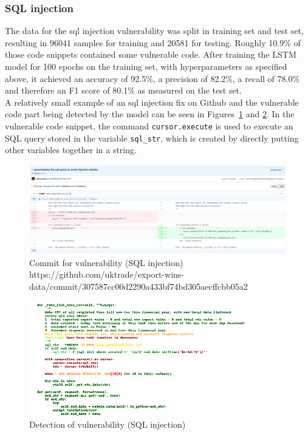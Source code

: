 \documentclass[
a4paper,
pagesize,
pdftex,
12pt,
twoside, %
BCOR=5mm, %
ngerman,
fleqn,
final,
]{scrartcl}
\begin{document}
	\newpage
	
	\subsubsection{SQL injection}
	The data for the sql injection vulnerability was split in training set and test set, resulting in 96041 samples for training and 20581 for testing. Roughly 10.9\% of those code snippets contained some vulnerable code. After training the LSTM model for 100 epochs on the training set, with hyperparameters as specified above, it achieved an accuracy of 92.5\%, a precision of 82.2\%, a recall of 78.0\% and therefore an F1 score of 80.1\% as measured on the test set.\\
	A relatively small example of an sql injection fix on Github and the vulnerable code part being detected by the model can be seen in Figures~\ref{fig:sqlB} and \ref{fig:sqlBr}. In the vulnerable code snippet, the command \texttt{cursor.execute} is used to execute an SQL query stored in the variable \texttt{sql\_str}, which is created by directly putting other variables together in a string.
	
	\begin{figure}[H]
		\centering
		\includegraphics[width=\linewidth]{Images/sqlB}
		\caption{Commit for vulnerability (SQL injection) \newline \scriptsize{https://github.com/uktrade/export-wins-data/commit/307587cc00d2290a433bf74bd305aecffcbb05a2}}
		\label{fig:sqlB}
	\end{figure}
	\begin{figure}[H]
		\centering
		\includegraphics[width=\linewidth]{Images/sqlBr}
		\caption{Detection of vulnerability (SQL injection)}
		\label{fig:sqlBr}
	\end{figure}
\end{document}
